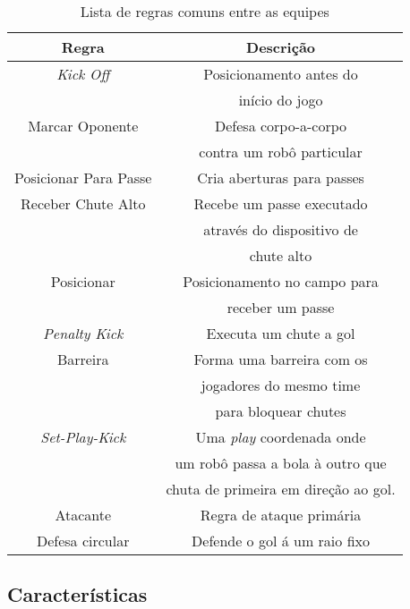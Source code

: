 \begin{table}
  \begin{center}
    \begin{tabular}{|c|c|}
      \hline
      Regra                  & Descrição \\
      \hline
      \textit{Kick Off}      & Posicionamento antes do\\
                             & início do jogo\\
      \hline
      Marcar Oponente        & Defesa corpo-a-corpo\\
                             & contra um robô particular\\
      \hline
      Posicionar Para Passe  & Cria aberturas para passes\\
      \hline
      Receber Chute Alto     & Recebe um passe executado\\
                             & através do dispositivo de\\
      & chute alto\\
      \hline
      Posicionar             & Posicionamento no campo para\\
                             & receber um passe\\
      \hline
      \textit{Penalty Kick}  & Executa um chute a gol\\
      \hline
      Barreira               & Forma uma barreira com os \\
                             & jogadores do mesmo time \\
                             & para bloquear chutes\\
      \hline
      \textit{Set-Play-Kick} & Uma \textit{play} coordenada onde\\
                             & um robô passa a bola à outro que \\
                             & chuta de primeira em direção ao gol.\\
      \hline
      Atacante               & Regra de ataque primária\\
      \hline
      Defesa circular        & Defende o gol á um raio fixo\\
      \hline
    \end{tabular}
  \caption{Lista de regras comuns entre as equipes}
  \label{regras}
  \end{center}
\end{table}


\subsection{Características}


